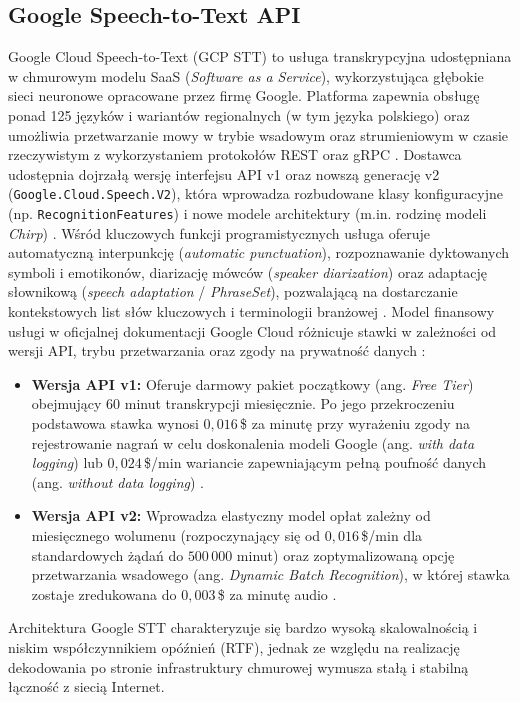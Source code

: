 \subsection{Google Speech-to-Text API}
Google Cloud Speech-to-Text (GCP STT) to usługa transkrypcyjna udostępniana w chmurowym modelu SaaS (\textit{Software as a Service}), wykorzystująca głębokie sieci neuronowe opracowane przez firmę Google. Platforma zapewnia obsługę ponad 125 języków i wariantów regionalnych (w tym języka polskiego) oraz umożliwia przetwarzanie mowy w trybie wsadowym oraz strumieniowym w czasie rzeczywistym z wykorzystaniem protokołów REST oraz gRPC \cite{google_stt_v2_doc}. Dostawca udostępnia dojrzałą wersję interfejsu API v1 oraz nowszą generację v2 (\texttt{Google.Cloud.Speech.V2}), która wprowadza rozbudowane klasy konfiguracyjne (np. \texttt{RecognitionFeatures}) i nowe modele architektury (m.in. rodzinę modeli \textit{Chirp}) \cite{google_stt_v2_doc}. Wśród kluczowych funkcji programistycznych usługa oferuje automatyczną interpunkcję (\textit{automatic punctuation}), rozpoznawanie dyktowanych symboli i emotikonów, diarizację mówców (\textit{speaker diarization}) oraz adaptację słownikową (\textit{speech adaptation} / \textit{PhraseSet}), pozwalającą na dostarczanie kontekstowych list słów kluczowych i terminologii branżowej \cite{google_stt_v2_doc}. Model finansowy usługi w oficjalnej dokumentacji Google Cloud różnicuje stawki w zależności od wersji API, trybu przetwarzania oraz zgody na prywatność danych \cite{google_stt_pricing}:
\begin{itemize}
\item \textbf{Wersja API v1:} Oferuje darmowy pakiet początkowy (ang. \textit{Free Tier}) obejmujący 60 minut transkrypcji miesięcznie. Po jego przekroczeniu podstawowa stawka wynosi $0{,}016$\,\$ za minutę przy wyrażeniu zgody na rejestrowanie nagrań w celu doskonalenia modeli Google (ang. \textit{with data logging}) lub $0{,}024$\,\$/min wariancie zapewniającym pełną poufność danych (ang. \textit{without data logging}) \cite{google_stt_pricing}.
\item \textbf{Wersja API v2:} Wprowadza elastyczny model opłat zależny od miesięcznego wolumenu (rozpoczynający się od $0{,}016$\,\$/min dla standardowych żądań do $500\,000$ minut) oraz zoptymalizowaną opcję przetwarzania wsadowego (ang. \textit{Dynamic Batch Recognition}), w której stawka zostaje zredukowana do $0{,}003$\,\$ za minutę audio \cite{google_stt_pricing}.
\end{itemize}
Architektura Google STT charakteryzuje się bardzo wysoką skalowalnością i niskim współczynnikiem opóźnień (RTF), jednak ze względu na realizację dekodowania po stronie infrastruktury chmurowej wymusza stałą i stabilną łączność z siecią Internet.

